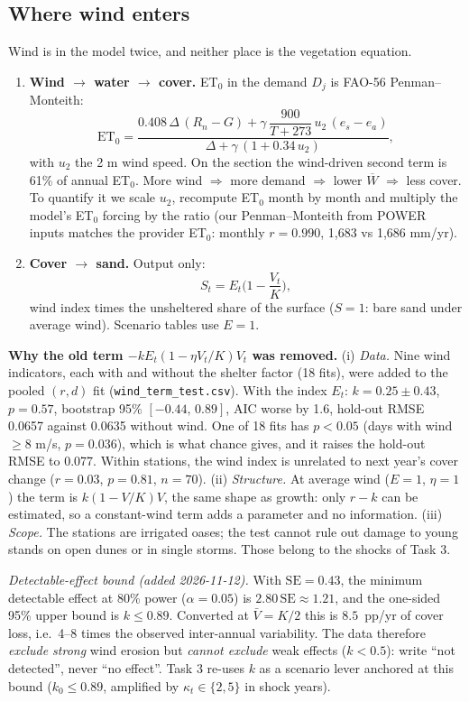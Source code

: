 \documentclass[11pt,a4paper]{article}
\newcommand{\Wb}{\overline W}
\begin{document}
\subsection{Where wind enters}\label{sec:wind}
Wind is in the model twice, and neither place is the vegetation equation.
\begin{enumerate}
\item \textbf{Wind $\to$ water $\to$ cover.} ET$_0$ in the demand $D_j$ is FAO-56 Penman--Monteith:
\begin{equation}\label{eq:pm}
\mathrm{ET}_0=\frac{0.408\,\Delta\,(R_n-G)+\gamma\,\dfrac{900}{T+273}\,u_2\,(e_s-e_a)}{\Delta+\gamma\,(1+0.34\,u_2)},
\end{equation}
with $u_2$ the 2 m wind speed. On the section the wind-driven second term is 61\% of annual ET$_0$.
More wind $\Rightarrow$ more demand $\Rightarrow$ lower $\Wb$ $\Rightarrow$ less cover. To quantify it we scale $u_2$,
recompute ET$_0$ month by month and multiply the model's ET$_0$ forcing by the ratio (our Penman--Monteith
from POWER inputs matches the provider ET$_0$: monthly $r=0.990$, 1,683 vs 1,686 mm/yr).
\item \textbf{Cover $\to$ sand.} Output only:
\begin{equation}\label{eq:sand}
S_t=E_t\Big(1-\frac{V_t}{K}\Big),
\end{equation}
wind index times the unsheltered share of the surface ($S=1$: bare sand under average wind). Scenario
tables use $E=1$.
\end{enumerate}
\textbf{Why the old term $-kE_t(1-\eta V_t/K)V_t$ was removed.}
(i) \emph{Data.} Nine wind indicators, each with and without the shelter factor (18 fits), were added to the
pooled $(r,d)$ fit (\texttt{wind\_term\_test.csv}). With the index $E_t$: $k=0.25\pm0.43$, $p=0.57$,
bootstrap 95\% $[-0.44,\,0.89]$, AIC worse by 1.6, hold-out RMSE 0.0657 against 0.0635 without wind.
One of 18 fits has $p<0.05$ (days with wind $\ge8$ m/s, $p=0.036$), which is what chance gives, and it raises
the hold-out RMSE to 0.077. Within stations, the wind index is unrelated to next year's cover change ($r=0.03$, $p=0.81$, $n=70$).
(ii) \emph{Structure.} At average wind ($E=1$, $\eta=1$) the term is $k(1-V/K)V$, the same shape as growth:
only $r-k$ can be estimated, so a constant-wind term adds a parameter and no information.
(iii) \emph{Scope.} The stations are irrigated oases; the test cannot rule out damage to young stands on
open dunes or in single storms. Those belong to the shocks of Task 3.

\emph{Detectable-effect bound (added 2026-11-12).} With $\mathrm{SE}=0.43$, the minimum detectable effect at
80\% power ($\alpha=0.05$) is $2.80\,\mathrm{SE}\approx1.21$, and the one-sided 95\% upper bound is $k\le0.89$.
Converted at $\bar V=K/2$ this is $8.5$~pp/yr of cover loss, i.e.\ 4--8 times the observed inter-annual
variability. The data therefore \emph{exclude strong} wind erosion but \emph{cannot exclude} weak effects
($k<0.5$): write ``not detected'', never ``no effect''. Task 3 re-uses $k$ as a scenario lever anchored at
this bound ($k_0\le0.89$, amplified by $\kappa_t\in\{2,5\}$ in shock years).
\end{document}
